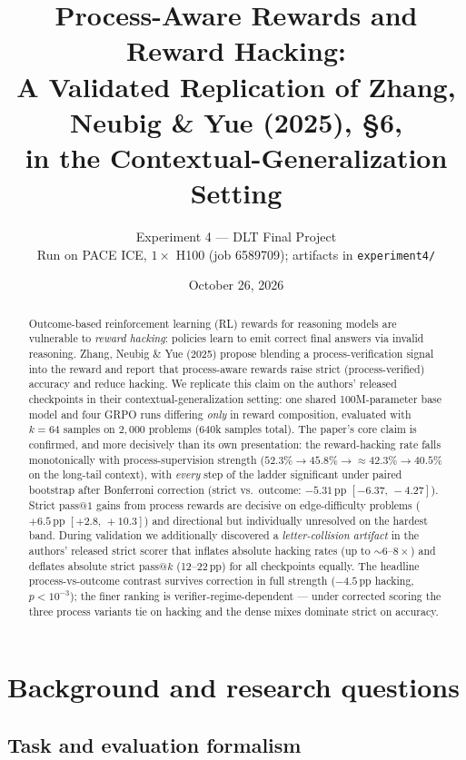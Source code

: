 \documentclass[11pt]{article}
\title{\textbf{Process-Aware Rewards and Reward Hacking:\\
A Validated Replication of Zhang, Neubig \& Yue (2025), \S6,\\
in the Contextual-Generalization Setting}}
\author{Experiment 4 --- DLT Final Project\\[2pt]
\small Run on PACE ICE, $1\times$ H100 (job 6589709); artifacts in \texttt{experiment4/}}
\date{October 26, 2026}
\makeatletter
\newcommand{\passk}[1]{\ensuremath{\mathrm{pass}@#1}}
\newcommand{\pp}{\,\mathrm{pp}}
\newcommand{\ci}[2]{\ensuremath{[#1,\,#2]}}
\makeatother
\begin{document}
\maketitle

\begin{abstract}
Outcome-based reinforcement learning (RL) rewards for reasoning models are vulnerable to
\emph{reward hacking}: policies learn to emit correct final answers via invalid
reasoning. Zhang, Neubig \& Yue (2025) propose blending a process-verification signal
into the reward and report that process-aware rewards raise strict (process-verified)
accuracy and reduce hacking. We replicate this claim on the authors' released
checkpoints in their contextual-generalization setting: one shared 100M-parameter base
model and four GRPO runs differing \emph{only} in reward composition, evaluated with
$k{=}64$ samples on $2{,}000$ problems ($640$k samples total). The paper's core claim is
confirmed, and more decisively than its own presentation: the reward-hacking rate falls
monotonically with process-supervision strength
($52.3\% \to 45.8\% \to {\approx}42.3\% \to 40.5\%$ on the long-tail context), with
\emph{every} step of the ladder significant under paired bootstrap after Bonferroni
correction (strict vs.\ outcome: $-5.31\pp$ \ci{-6.37}{-4.27}). Strict \passk{1} gains
from process rewards are decisive on edge-difficulty problems ($+6.5\pp$
\ci{+2.8}{+10.3}) and directional but individually unresolved on the hardest band.
During validation we additionally discovered a \emph{letter-collision artifact} in the
authors' released strict scorer that inflates absolute hacking rates (up to ${\sim}6$--$8\times$)
and deflates absolute strict \passk{k} (12--22$\pp$) for all checkpoints equally.
The headline process-vs-outcome contrast survives correction in full strength
($-4.5\pp$ hacking, $p<10^{-3}$); the finer ranking is verifier-regime-dependent ---
under corrected scoring the three process variants tie on hacking and the dense
mixes dominate strict on accuracy.
\end{abstract}

\section{Background and research questions}

\subsection{Task and evaluation formalism}
\end{document}
